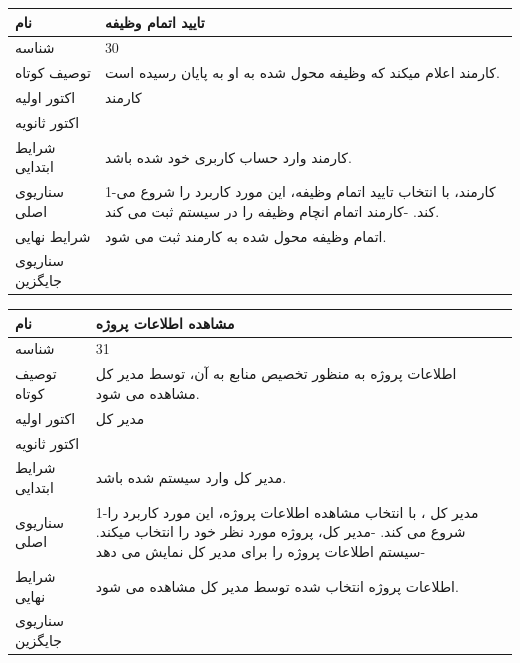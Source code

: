 \documentclass{article}
\begin{document}
\vspace{2cm}

\begin{tabular}{|p{2cm}|p{10cm}|}
\hline
نام
&
تایید اتمام وظیفه
\\
\hline
شناسه
&
30
\\
\hline
توصیف کوتاه  
&
کارمند اعلام میکند که وظیفه محول شده به او به پایان رسیده است.
\\
\hline
اکتور اولیه
&
کارمند
\\
\hline
اکتور ثانویه
&

\\
\hline
شرایط ابتدایی
&
 کارمند وارد حساب کاربری خود شده باشد. 
\\
\hline
سناریوی اصلی
&
1-کارمند، با انتخاب تایید اتمام وظیفه، این مورد کاربرد را شروع می کند.
\newline
2-کارمند اتمام انچام وظیفه را در سیستم ثبت می کند.
\\
\hline
شرایط نهایی
&
اتمام وظیفه محول شده به کارمند ثبت می شود.
\\
\hline
سناریوی جایگزین
&

\\
\hline
\end{tabular}

\vspace{2cm}

\begin{tabular}{|p{2cm}|p{10cm}|}
\hline
نام
&
مشاهده  اطلاعات پروژه
\\
\hline
شناسه
&
31
\\
\hline
توصیف کوتاه
&
اطلاعات پروژه به منظور تخصیص منابع به آن، توسط مدیر کل مشاهده می شود.
\\
\hline
اکتور اولیه
&
مدیر کل
\\
\hline
اکتور ثانویه
&

\\
\hline
شرایط ابتدایی
&
مدیر کل وارد سیستم شده باشد. 
\\
\hline
سناریوی اصلی
&
1-مدیر کل ، با انتخاب مشاهده  اطلاعات پروژه، این مورد کاربرد را شروع می کند.
\newline
2-مدیر کل، پروژه مورد نظر خود را انتخاب میکند.
\newline
3-سیستم اطلاعات پروژه را برای مدیر کل نمایش می دهد
\\
\hline
شرایط نهایی
&
اطلاعات پروژه  انتخاب شده توسط مدیر کل مشاهده می شود.
\\
\hline
سناریوی جایگزین
&

\\
\hline
\end{tabular}
\end{document}
